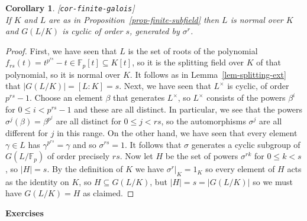 \documentclass{amsart}
\newcommand{\lbl}[1]{\label{#1}\textup{[\texttt{#1}]}\ \\}
\newcommand{\lbl}{\label}
\newcommand{\F}         {{\mathbb{F}}}
\newcommand{\bt}        {\beta}
\newcommand{\gm}        {\gamma}
\newcommand{\sg}        {\sigma}
\newcommand{\tm}        {\times}
\newcommand{\sse}       {\subseteq}
\renewcommand{\:}{\colon}
\newtheorem{corollary}[theorem]{Corollary}
\theoremstyle{definition}
\begin{document}
\begin{corollary}\lbl{cor-finite-galois}
 If $K$ and $L$ are as in Proposition~\ref{prop-finite-subfield} then
 $L$ is normal over $K$ and $G(L/K)$ is cyclic of order $s$, generated
 by $\sg^r$. 
\end{corollary}
\begin{proof}
 First, we have seen that $L$ is the set of roots of the polynomial
 $f_{rs}(t)=t^{p^{rs}}-t\in\F_p[t]\sse K[t]$, so it is the splitting
 field over $K$ of that polynomial, so it is normal over $K$.  It
 follows as in Lemma~\ref{lem-splitting-ext} that $|G(L/K)|=[L:K]=s$.
 Next, we have seen that $L^\tm$ is cyclic, of order $p^{rs}-1$.
 Choose an element $\bt$ that generates $L^\tm$, so $L^\tm$ consists
 of the powers $\bt^i$ for $0\leq i<p^{rs}-1$ and these are all
 distinct.  In particular, we see that the powers
 $\sg^j(\bt)=\bt^{p^j}$ are all distinct for $0\leq j<rs$, so the
 automorphisms $\sg^j$ are all different for $j$ in this range.  On
 the other hand, we have seen that every element $\gm\in L$ has
 $\gm^{p^{rs}}=\gm$ and so $\sg^{rs}=1$.  It follows that $\sg$
 generates a cyclic subgroup of $G(L/\F_p)$ of order precisely $rs$.
 Now let $H$ be the set of powers $\sg^{rk}$ for $0\leq k<s$, so
 $|H|=s$.  By the definition of $K$ we have $\sg^r|_K=1_K$ so every
 element of $H$ acts as the identity on $K$, so $H\sse G(L/K)$, but
 $|H|=s=|G(L/K)|$ so we must have $G(L/K)=H$ as claimed.
\end{proof}


\begin{center}
 \Large \textbf{Exercises}
\end{center}
\end{document}
